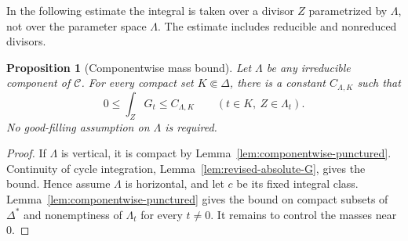 \documentclass[11pt]{amsart}
\numberwithin{equation}{section}
\theoremstyle{plain}
\newtheorem{prop}[thm]{Proposition}
\theoremstyle{definition}
\begin{document}
In the following estimate the integral is taken over a divisor $Z$
parametrized by $\Lambda$, not over the parameter space $\Lambda$.
The estimate includes reducible and nonreduced divisors.

\begin{prop}[Componentwise mass bound]\label{prop:componentwise-mass-bound}
Let $\Lambda$ be any irreducible component of $\mathscr C$.
For every compact set $K\Subset\Delta$, there is a constant
$C_{\Lambda,K}$ such that
\begin{equation}\label{eq:componentwise-mass-bound}
 0\le\int_ZG_t\le C_{\Lambda,K}
 \qquad(t\in K,\ Z\in\Lambda_t).
\end{equation}
No good-filling assumption on $\Lambda$ is required.
\end{prop}

\begin{proof}
If $\Lambda$ is vertical, it is compact by
Lemma~\ref{lem:componentwise-punctured}.  Continuity of cycle
integration, Lemma~\ref{lem:revised-absolute-G}, gives the bound.
Hence assume $\Lambda$ is horizontal, and let $c$ be its fixed
integral class.  Lemma~\ref{lem:componentwise-punctured} gives the bound on
compact subsets of $\Delta^*$ and nonemptiness of $\Lambda_t$ for
every $t\ne0$.  It remains to control the masses near $0$.


\end{proof}
\end{document}
